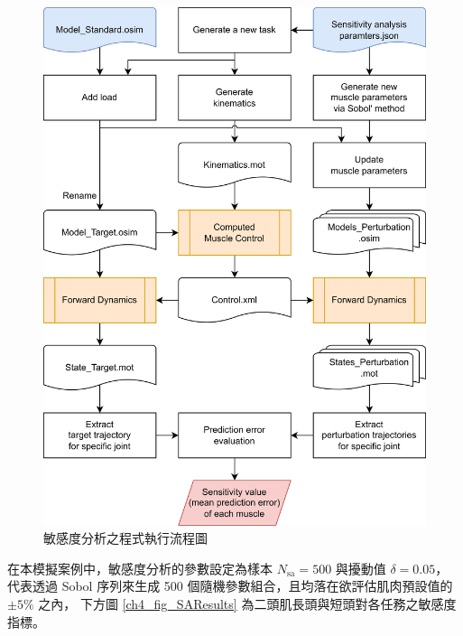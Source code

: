 \bigskip
\begin{figure}[!ht]
	\centering
	\includegraphics[width=11.5cm]{figure/ch4_flowchart_SA.PNG}
    \caption[敏感度分析之程式執行流程圖]{敏感度分析之程式執行流程圖}
    \label{ch4_flowchart_SA}
\end{figure}

\clearpage

在本模擬案例中，敏感度分析的參數設定為樣本 $N_\mathrm{sa} = 500$ 與擾動值 $\delta = 0.05$，
代表透過 Sobol 序列來生成 500 個隨機參數組合，且均落在欲評估肌肉預設值的 $\pm 5\%$ 之內，
下方圖 \ref{ch4_fig_SAResults} 為二頭肌長頭與短頭對各任務之敏感度指標。

